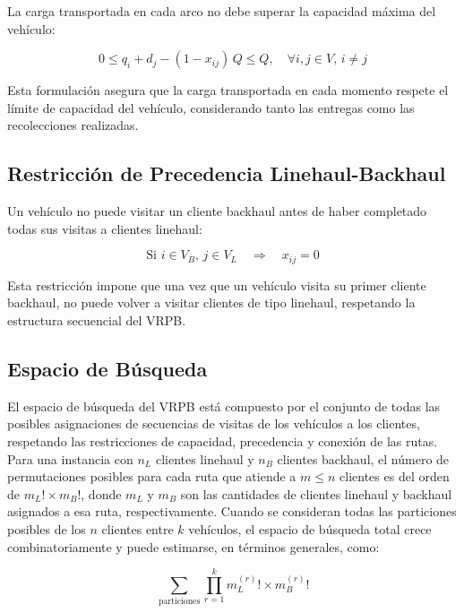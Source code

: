 \documentclass[letter, 10pt]{article}
\begin{document}
La carga transportada en cada arco no debe superar la capacidad m\'axima del veh\'iculo:

\begin{equation}
0 \leq q_i + d_j - (1 - x_{ij}) \, Q \leq Q, \quad \forall i, j \in V, \, i \neq j
\label{eq:capacidad}
\end{equation}

Esta formulaci\'on asegura que la carga transportada en cada momento respete el l\'imite de capacidad del veh\'iculo, considerando tanto las entregas como las recolecciones realizadas.

\subsection*{Restricci\'on de Precedencia Linehaul-Backhaul}

Un veh\'iculo no puede visitar un cliente backhaul antes de haber completado todas sus visitas a clientes linehaul:

\begin{equation}
\text{Si } i \in V_B, \, j \in V_L \quad \Rightarrow \quad x_{ij} = 0
\label{eq:precedencia}
\end{equation}

Esta restricci\'on impone que una vez que un veh\'iculo visita su primer cliente backhaul, no puede volver a visitar clientes de tipo linehaul, respetando la estructura secuencial del VRPB.

\subsection*{Espacio de B\'usqueda}

El espacio de b\'usqueda del VRPB est\'a compuesto por el conjunto de todas las posibles asignaciones de secuencias de visitas de los veh\'iculos a los clientes, respetando las restricciones de capacidad, precedencia y conexi\'on de las rutas. Para una instancia con \( n_L \) clientes linehaul y \( n_B \) clientes backhaul, el n\'umero de permutaciones posibles para cada ruta que atiende a \( m \leq n \) clientes es del orden de \( m_L! \times m_B! \), donde \( m_L \) y \( m_B \) son las cantidades de clientes linehaul y backhaul asignados a esa ruta, respectivamente. Cuando se consideran todas las particiones posibles de los \( n \) clientes entre \( k \) veh\'iculos, el espacio de b\'usqueda total crece combinatoriamente y puede estimarse, en t\'erminos generales, como:

\begin{equation}
\sum_{\text{particiones}} \prod_{r=1}^{k} m_{L}^{(r)}! \times m_{B}^{(r)}!
\end{equation}
\end{document}
